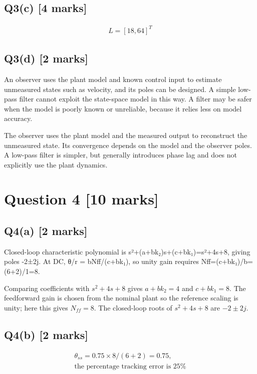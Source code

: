 \documentclass[11pt,a4paper]{article}
\begin{document}
\subsection*{Q3(c) \hfill [4 marks]}

\[\begin{aligned}L = [18,64]^T\end{aligned}\]

\subsection*{Q3(d) \hfill [2 marks]}

An observer uses the plant model and known control input to estimate unmeasured states such as velocity, and its poles can be designed.
A simple low-pass filter cannot exploit the state-space model in this way.
A filter may be safer when the model is poorly known or unreliable, because it relies less on model accuracy.\par\smallskip The observer uses the plant model and the measured output to reconstruct the unmeasured state. Its convergence depends on the model and the observer poles. A low-pass filter is simpler, but generally introduces phase lag and does not explicitly use the plant dynamics.

\section*{Question 4 \hfill [10 marks]}
\subsection*{Q4(a) \hfill [2 marks]}

Closed-loop characteristic polynomial is s²+(a+bk₂)s+(c+bk₁)=s²+4s+8, giving poles -2±2j.
At DC, θ/r = bNff/(c+bk₁), so unity gain requires Nff=(c+bk₁)/b=(6+2)/1=8.\par\smallskip Comparing coefficients with $s^2+4s+8$ gives $a+bk_2=4$ and $c+bk_1=8$. The feedforward gain is chosen from the nominal plant so the reference scaling is unity; here this gives $N_{ff}=8$. The closed-loop roots of $s^2+4s+8$ are $-2\pm2j$.

\subsection*{Q4(b) \hfill [2 marks]}

\[\begin{aligned}\theta_{ss} = 0.75\times8/(6+2)=0.75,\\ \text{the percentage tracking error is 25\%}\end{aligned}\]
\end{document}
